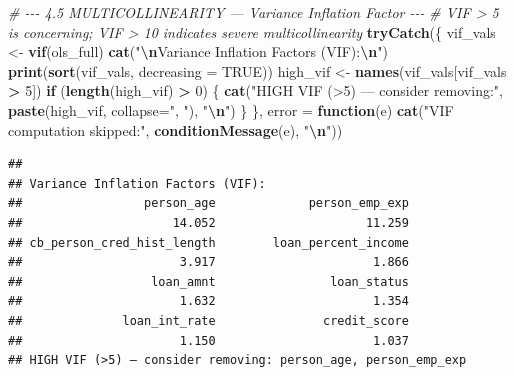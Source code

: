 \documentclass[
]{article}
\newenvironment{Shaded}{\begin{snugshade}}{\end{snugshade}}
\newcommand{\AttributeTok}[1]{\textcolor[rgb]{0.13,0.29,0.53}{#1}}
\newcommand{\CommentTok}[1]{\textcolor[rgb]{0.56,0.35,0.01}{\textit{#1}}}
\newcommand{\ConstantTok}[1]{\textcolor[rgb]{0.56,0.35,0.01}{#1}}
\newcommand{\ControlFlowTok}[1]{\textcolor[rgb]{0.13,0.29,0.53}{\textbf{#1}}}
\newcommand{\DecValTok}[1]{\textcolor[rgb]{0.00,0.00,0.81}{#1}}
\newcommand{\FunctionTok}[1]{\textcolor[rgb]{0.13,0.29,0.53}{\textbf{#1}}}
\newcommand{\NormalTok}[1]{#1}
\newcommand{\OtherTok}[1]{\textcolor[rgb]{0.56,0.35,0.01}{#1}}
\newcommand{\SpecialCharTok}[1]{\textcolor[rgb]{0.81,0.36,0.00}{\textbf{#1}}}
\newcommand{\StringTok}[1]{\textcolor[rgb]{0.31,0.60,0.02}{#1}}
\begin{document}
\begin{Shaded}
\begin{Highlighting}[]
\CommentTok{\# {-}{-}{-} 4.5  MULTICOLLINEARITY — Variance Inflation Factor {-}{-}{-}}
\CommentTok{\# VIF \textgreater{} 5 is concerning; VIF \textgreater{} 10 indicates severe multicollinearity}
\FunctionTok{tryCatch}\NormalTok{(\{}
\NormalTok{  vif\_vals }\OtherTok{\textless{}{-}} \FunctionTok{vif}\NormalTok{(ols\_full)}
  \FunctionTok{cat}\NormalTok{(}\StringTok{"}\SpecialCharTok{\textbackslash{}n}\StringTok{Variance Inflation Factors (VIF):}\SpecialCharTok{\textbackslash{}n}\StringTok{"}\NormalTok{)}
  \FunctionTok{print}\NormalTok{(}\FunctionTok{sort}\NormalTok{(vif\_vals, }\AttributeTok{decreasing =} \ConstantTok{TRUE}\NormalTok{))}
\NormalTok{  high\_vif }\OtherTok{\textless{}{-}} \FunctionTok{names}\NormalTok{(vif\_vals[vif\_vals }\SpecialCharTok{\textgreater{}} \DecValTok{5}\NormalTok{])}
  \ControlFlowTok{if}\NormalTok{ (}\FunctionTok{length}\NormalTok{(high\_vif) }\SpecialCharTok{\textgreater{}} \DecValTok{0}\NormalTok{) \{}
    \FunctionTok{cat}\NormalTok{(}\StringTok{"HIGH VIF (\textgreater{}5) — consider removing:"}\NormalTok{, }\FunctionTok{paste}\NormalTok{(high\_vif, }\AttributeTok{collapse=}\StringTok{", "}\NormalTok{), }\StringTok{"}\SpecialCharTok{\textbackslash{}n}\StringTok{"}\NormalTok{)}
\NormalTok{  \}}
\NormalTok{\}, }\AttributeTok{error =} \ControlFlowTok{function}\NormalTok{(e) }\FunctionTok{cat}\NormalTok{(}\StringTok{"VIF computation skipped:"}\NormalTok{, }\FunctionTok{conditionMessage}\NormalTok{(e), }\StringTok{"}\SpecialCharTok{\textbackslash{}n}\StringTok{"}\NormalTok{))}
\end{Highlighting}
\end{Shaded}

\begin{verbatim}
## 
## Variance Inflation Factors (VIF):
##                 person_age             person_emp_exp 
##                     14.052                     11.259 
## cb_person_cred_hist_length        loan_percent_income 
##                      3.917                      1.866 
##                  loan_amnt                loan_status 
##                      1.632                      1.354 
##              loan_int_rate               credit_score 
##                      1.150                      1.037 
## HIGH VIF (>5) — consider removing: person_age, person_emp_exp
\end{verbatim}
\end{document}
